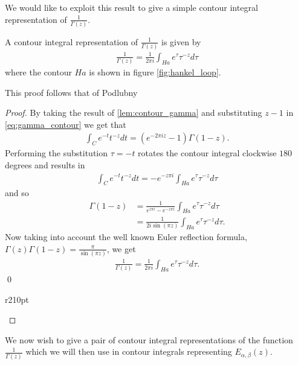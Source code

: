 We would like to exploit this result to give a simple contour integral representation of $ \frac{1}{\Gamma(z)} $.

\begin{lemma}
    \label{lem:contour_1_gamma_1}
    A contour integral representation of $ \frac{1}{\Gamma(z)} $ is given by
    \begin{align}
        \frac{1}{\Gamma(z)} = \frac{1}{2 \pi i} \int_{Ha} e^\tau \tau^{-z} d\tau
    \end{align}
    where the contour $ Ha $ is shown in figure \ref{fig:hankel_loop}.
\end{lemma}
This proof follows that of Podlubny \cite{Podlubny1999}
\begin{proof}
    By taking the result of \ref{lem:contour_gamma} and substituting $ z-1 $ in \eqref{eq:gamma_contour}
    we get that
    \begin{align}
        \int_C e^{-t} t^{-z} dt = (e^{-2 \pi i z} -1) \Gamma(1-z).
    \end{align}
    Performing the substitution $ \tau = -t $ rotates the contour integral clockwise $ 180 $ degrees 
    and results in 
    \begin{align}
        \int_{C} e^{-t} t^{-z} dt = - e^{-z\pi i}\int_{Ha} e^{\tau} \tau^{-z} d\tau
    \end{align}
    and so
    \begin{align}
        \Gamma(1-z) &= \frac{1}{e^{z\pi i} - e^{-z \pi i}} \int_{Ha} e^\tau \tau^{-z} d\tau \\
            &= \frac{1}{2i \sin(\pi z)}\int_{Ha} e^\tau \tau^{-z} d\tau.
    \end{align}
    Now taking into account the well known Euler reflection formula, $ \Gamma(z)\Gamma(1-z) = \frac{\pi}{\sin(\pi z)} $, we get
    \begin{align}
        \frac{1}{\Gamma(z)} = \frac{1}{2 \pi i} \int_{Ha} e^\tau \tau^{-z} d\tau.
    \end{align} \qed
    \begin{wrapfigure}{r}{210pt}
        
        \caption{The Hankel contour Ha}
        \label{fig:hankel_loop}
    \end{wrapfigure}
\end{proof}

We now wish to give a pair of contour integral representations of the function $ \frac{1}{\Gamma(z)} $
which we will then use in contour integrals representing $ E_{\alpha, \beta}(z) $. 

